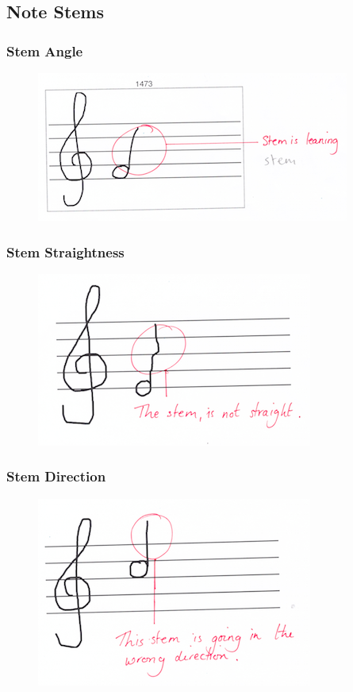 \subsection{Note Stems}

\subsubsection{Stem Angle}\label{sec:tf-stem-angle}

\begin{figure}[H]
  \centering
  \includegraphics[width=.6\linewidth]{gfx/teacher-notes/mistake-stem-angle.png}
  \caption{}
\end{figure}

\subsubsection{Stem Straightness}\label{sec:tf-stem-straightness}

\begin{figure}[H]
  \centering
  \includegraphics[width=.6\linewidth]{gfx/teacher-notes/mistake-stem-not-straight}
  \caption{}
\end{figure}

\subsubsection{Stem Direction}\label{sec:tf-stem-direction}

\begin{figure}[H]
  \centering
  \includegraphics[width=.6\linewidth]{gfx/teacher-notes/mistake-stem-wrong-direction.png}
  \caption{}
\end{figure}

